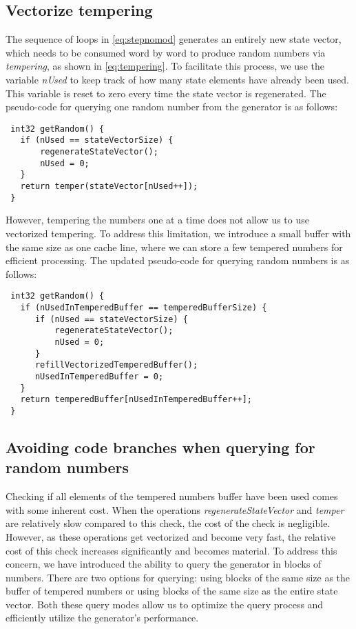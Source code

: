 \documentclass[preprint,1p,times]{elsarticle}
\begin{document}
\subsection{Vectorize tempering}
The sequence of loops in \eqref{eq:stepnomod} generates an entirely new state vector, which needs to be consumed word by word to produce random numbers via \textit{tempering}, as shown in \eqref{eq:tempering}. To facilitate this process, we use the variable \textit{nUsed} to keep track of how many state elements have already been used. This variable is reset to zero every time the state vector is regenerated. The pseudo-code for querying one random number from the generator is as follows:
\begin{verbatim}
 int32 getRandom() {
   if (nUsed == stateVectorSize) {
       regenerateStateVector();
       nUsed = 0;
   }
   return temper(stateVector[nUsed++]);
 }
\end{verbatim}
However, tempering the numbers one at a time does not allow us to use vectorized tempering. To address this limitation, we introduce a small buffer with the same size as one cache line, where we can store a few tempered numbers for efficient processing. The updated pseudo-code for querying random numbers is as follows:
\begin{verbatim}
 int32 getRandom() {
   if (nUsedInTemperedBuffer == temperedBufferSize) {
      if (nUsed == stateVectorSize) {
          regenerateStateVector();
          nUsed = 0;
      }
      refillVectorizedTemperedBuffer();
      nUsedInTemperedBuffer = 0;
   }
   return temperedBuffer[nUsedInTemperedBuffer++];
 }
\end{verbatim}
\subsection{Avoiding code branches when querying for random numbers}
\label{seq:blocks}
Checking if all elements of the tempered numbers buffer have been used comes with some inherent cost. When the operations \textit{regenerateStateVector} and \textit{temper} are relatively slow compared to this check, the cost of the check is negligible. However, as these operations get vectorized and become very fast, the relative cost of this check increases significantly and becomes material. To address this concern, we have introduced the ability to query the generator in blocks of numbers. There are two options for querying: using blocks of the same size as the buffer of tempered numbers or using blocks of the same size as the entire state vector. Both these query modes allow us to optimize the query process and efficiently utilize the generator's performance.
\end{document}
